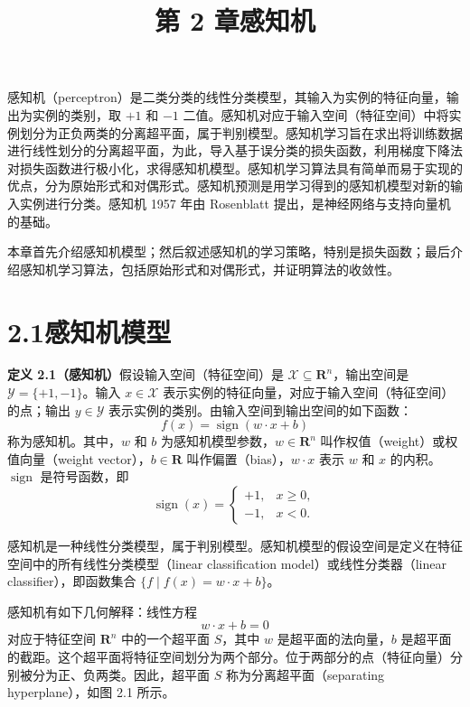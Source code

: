 \documentclass[UTF8, 12pt, fontset=fandol, oneside]{ctexart}
\title{第 2 章\quad 感知机}
\author{}
\date{}
\begin{document}
\maketitle

感知机（perceptron）是二类分类的线性分类模型，其输入为实例的特征向量，输出为实例的类别，取 $+1$ 和 $-1$ 二值。感知机对应于输入空间（特征空间）中将实例划分为正负两类的分离超平面，属于判别模型。感知机学习旨在求出将训练数据进行线性划分的分离超平面，为此，导入基于误分类的损失函数，利用梯度下降法对损失函数进行极小化，求得感知机模型。感知机学习算法具有简单而易于实现的优点，分为原始形式和对偶形式。感知机预测是用学习得到的感知机模型对新的输入实例进行分类。感知机 1957 年由 Rosenblatt 提出，是神经网络与支持向量机的基础。

本章首先介绍感知机模型；然后叙述感知机的学习策略，特别是损失函数；最后介绍感知机学习算法，包括原始形式和对偶形式，并证明算法的收敛性。

\section*{2.1\quad 感知机模型}

\noindent\textbf{定义 2.1（感知机）}\quad 假设输入空间（特征空间）是 $\mathcal{X}\subseteq\mathbf{R}^n$，输出空间是 $\mathcal{Y}=\{+1,-1\}$。输入 $x\in\mathcal{X}$ 表示实例的特征向量，对应于输入空间（特征空间）的点；输出 $y\in\mathcal{Y}$ 表示实例的类别。由输入空间到输出空间的如下函数：
\begin{equation}
  f(x)=\operatorname{sign}(w\cdot x+b)
  \tag{2.1}
\end{equation}
称为感知机。其中，$w$ 和 $b$ 为感知机模型参数，$w\in\mathbf{R}^n$ 叫作权值（weight）或权值向量（weight vector），$b\in\mathbf{R}$ 叫作偏置（bias），$w\cdot x$ 表示 $w$ 和 $x$ 的内积。$\operatorname{sign}$ 是符号函数，即
\begin{equation}
  \operatorname{sign}(x)=
  \begin{cases}
    +1, & x\ge 0,\\
    -1, & x<0.
  \end{cases}
  \tag{2.2}
\end{equation}

感知机是一种线性分类模型，属于判别模型。感知机模型的假设空间是定义在特征空间中的所有线性分类模型（linear classification model）或线性分类器（linear classifier），即函数集合 $\{f\mid f(x)=w\cdot x+b\}$。

感知机有如下几何解释：线性方程
\begin{equation}
  w\cdot x+b=0
  \tag{2.3}
\end{equation}
对应于特征空间 $\mathbf{R}^n$ 中的一个超平面 $S$，其中 $w$ 是超平面的法向量，$b$ 是超平面的截距。这个超平面将特征空间划分为两个部分。位于两部分的点（特征向量）分别被分为正、负两类。因此，超平面 $S$ 称为分离超平面（separating hyperplane），如图 2.1 所示。
\end{document}
